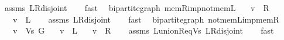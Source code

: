 \begin{isabellebody}
%
\isatagproof
{}\isamarkupfalse%
\ assms\ L{\isacharunderscore}{\kern0pt}R{\isacharunderscore}{\kern0pt}disjoint\isanewline
\ \ \isamarkupfalse%
\ fast%
\endisatagproof
{\isafoldproof}%
%
\isadelimproof
\isanewline
%
\endisadelimproof
%
\isadeliminvisible
\isanewline
%
\endisadeliminvisible
%
\isataginvisible
{}\isamarkupfalse%
\ {\isacharparenleft}{\kern0pt}\ bipartite{\isacharunderscore}{\kern0pt}graph{\isacharparenright}{\kern0pt}\ mem{\isacharunderscore}{\kern0pt}R{\isacharunderscore}{\kern0pt}imp{\isacharunderscore}{\kern0pt}not{\isacharunderscore}{\kern0pt}mem{\isacharunderscore}{\kern0pt}L{\isacharcolon}{\kern0pt}\isanewline
\ \ \ {\isachardoublequoteopen}v\ {\isasymin}\ R{\isachardoublequoteclose}\isanewline
\ \ \ {\isachardoublequoteopen}v\ {\isasymnotin}\ L{\isachardoublequoteclose}%
\endisataginvisible
{\isafoldinvisible}%
%
\isadeliminvisible
\isanewline
%
\endisadeliminvisible
%
\isadelimproof
\ \ %
\endisadelimproof
%
\isatagproof
{}\isamarkupfalse%
\ assms\ L{\isacharunderscore}{\kern0pt}R{\isacharunderscore}{\kern0pt}disjoint\isanewline
\ \ \isamarkupfalse%
\ fast%
\endisatagproof
{\isafoldproof}%
%
\isadelimproof
\isanewline
%
\endisadelimproof
%
\isadeliminvisible
\isanewline
%
\endisadeliminvisible
%
\isataginvisible
{}\isamarkupfalse%
\ {\isacharparenleft}{\kern0pt}\ bipartite{\isacharunderscore}{\kern0pt}graph{\isacharparenright}{\kern0pt}\ not{\isacharunderscore}{\kern0pt}mem{\isacharunderscore}{\kern0pt}L{\isacharunderscore}{\kern0pt}imp{\isacharunderscore}{\kern0pt}mem{\isacharunderscore}{\kern0pt}R{\isacharcolon}{\kern0pt}\isanewline
\ \ \ {\isachardoublequoteopen}v\ {\isasymin}\ Vs\ G{\isachardoublequoteclose}\isanewline
\ \ \ {\isachardoublequoteopen}v\ {\isasymnotin}\ L{\isachardoublequoteclose}\isanewline
\ \ \ {\isachardoublequoteopen}v\ {\isasymin}\ R{\isachardoublequoteclose}%
\endisataginvisible
{\isafoldinvisible}%
%
\isadeliminvisible
\isanewline
%
\endisadeliminvisible
%
\isadelimproof
\ \ %
\endisadelimproof
%
\isatagproof
{}\isamarkupfalse%
\ assms\ L{\isacharunderscore}{\kern0pt}union{\isacharunderscore}{\kern0pt}R{\isacharunderscore}{\kern0pt}eq{\isacharunderscore}{\kern0pt}Vs\ L{\isacharunderscore}{\kern0pt}R{\isacharunderscore}{\kern0pt}disjoint\isanewline
\ \ \isamarkupfalse%
\ fast%
\endisatagproof
{\isafoldproof}%
%
\isadelimproof
\isanewline
%
\endisadelimproof

\end{isabellebody}
